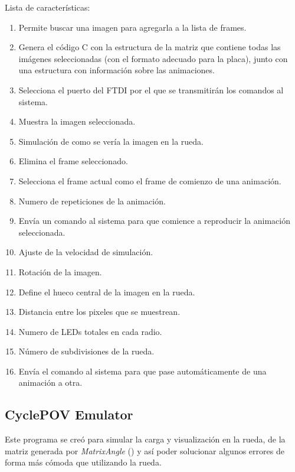 Lista de características:
\begin{enumerate}
	\item Permite buscar una imagen para agregarla a la lista de frames.
	\item Genera el código C con la estructura de la matriz que contiene
		todas las imágenes seleccionadas (con el formato adecuado para
		la placa), junto con una estructura con información sobre las
		animaciones.
	\item Selecciona el puerto del FTDI por el que se transmitirán los
		comandos al sistema.
	\item Muestra la imagen seleccionada.
	\item Simulación de como se vería la imagen en la rueda.
	\item Elimina el frame seleccionado.
	\item Selecciona el frame actual como el frame de comienzo de una
		animación.
	\item Numero de repeticiones de la animación.
	\item Envía un comando al sistema para que comience a reproducir la
		animación seleccionada.
	\item Ajuste de la velocidad de simulación.
	\item Rotación de la imagen.
	\item Define el hueco central de la imagen en la rueda.
	\item Distancia entre los pixeles que se muestrean.
	\item Numero de LEDs totales en cada radio.
	\item Número de subdivisiones de la rueda.
	\item Envía el comando al sistema para que pase automáticamente de una
		animación a otra.
\end{enumerate}

\subsection{CyclePOV Emulator}
Este programa se creó para simular la carga y visualización en la rueda, de la
matriz generada por \textsl{MatrixAngle} () y así poder
solucionar algunos errores de forma más cómoda que utilizando la rueda.

